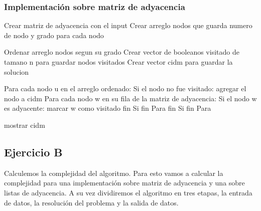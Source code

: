 \subsubsection{Implementación sobre matriz de adyacencia}
\begin{codesnippet}
Crear matriz de adyacencia con el input
Crear arreglo nodos que guarda numero de nodo y grado para cada nodo

Ordenar arreglo nodos segun su grado
Crear vector de booleanos visitado de tamano n para guardar nodos visitados
Crear vector cidm para guardar la solucion

Para cada nodo u en el arreglo ordenado:
	Si el nodo no fue visitado:
		agregar el nodo a cidm
		Para cada nodo w en su fila de la matriz de adyacencia:
			Si el nodo w es adyacente:
				marcar w como visitado
			fin Si
		fin Para
	fin Si
fin Para

mostrar cidm
\end{codesnippet}



\subsection{Ejercicio B}
Calculemos la complejidad del algoritmo. Para esto vamos a calcular la complejidad para una implementación sobre matriz de adyacencia y una sobre listas de adyacencia. A su vez dividiremos el algoritmo en tres etapas, la entrada de datos, la resolución del problema y la salida de datos. \\



